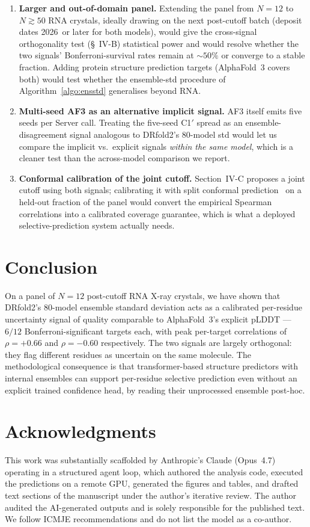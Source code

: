 \documentclass[conference,10pt]{IEEEtran}
\begin{document}
\begin{enumerate}
\item \textbf{Larger and out-of-domain panel.}
Extending the panel from $N=12$ to $N \gtrsim 50$ RNA crystals,
ideally drawing on the next post-cutoff batch (deposit dates
2026~or later for both models), would give the cross-signal
orthogonality test (\S~IV-B) statistical power and would resolve
whether the two signals' Bonferroni-survival rates remain at
$\sim$$50\%$ or converge to a stable fraction. Adding protein
structure prediction targets (AlphaFold~3 covers both) would test
whether the ensemble-std procedure of Algorithm~\ref{algo:ensstd}
generalises beyond RNA.
\item \textbf{Multi-seed AF3 as an alternative implicit signal.}
AF3 itself emits five seeds per Server call. Treating the
five-seed C1$'$ spread as an ensemble-disagreement signal
analogous to DRfold2's $80$-model std would let us compare the
implicit vs.\ explicit signals \emph{within the same model}, which
is a cleaner test than the across-model comparison we report.
\item \textbf{Conformal calibration of the joint cutoff.}
Section~IV-C proposes a joint cutoff using both signals; calibrating
it with split conformal prediction~\cite{vovk2005} on a held-out
fraction of the panel would convert the empirical Spearman
correlations into a calibrated coverage guarantee, which is what a
deployed selective-prediction system actually needs.
\end{enumerate}

\section{Conclusion}

On a panel of $N=12$ post-cutoff RNA X-ray crystals, we have shown
that DRfold2's $80$-model ensemble standard deviation acts as a
calibrated per-residue uncertainty signal of quality comparable to
AlphaFold~3's explicit pLDDT --- $6/12$ Bonferroni-significant targets
each, with peak per-target correlations of $\rho = +0.66$ and
$\rho = -0.60$ respectively. The two signals are largely
orthogonal: they flag different residues as uncertain on the same
molecule. The methodological consequence is that
transformer-based structure predictors with internal ensembles can
support per-residue selective prediction even without an explicit
trained confidence head, by reading their unprocessed ensemble
post-hoc.

\section*{Acknowledgments}
This work was substantially scaffolded by Anthropic's Claude
(Opus~4.7) operating in a structured agent loop, which authored
the analysis code, executed the predictions on a remote GPU,
generated the figures and tables, and drafted text sections of
the manuscript under the author's iterative review. The author
audited the AI-generated outputs and is solely responsible for
the published text. We follow ICMJE recommendations and do not
list the model as a co-author.
\end{document}

